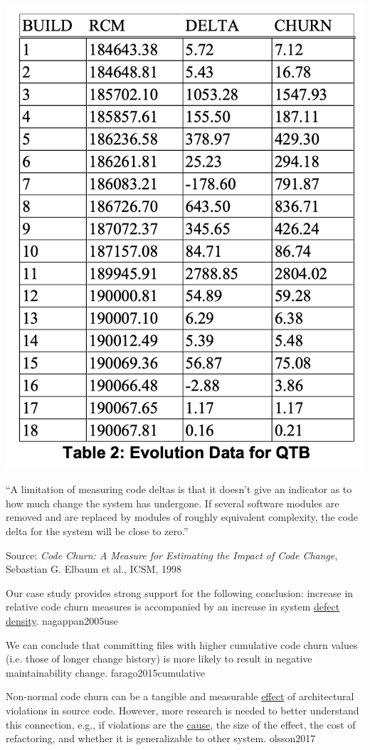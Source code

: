 \documentclass{article}
\begin{document}
\begin{multicols}{2}
\includegraphics[width=.7\columnwidth]{qtb.png}
\par\columnbreak\par
``A limitation of measuring code deltas is that it
doesn’t give an indicator as to how much change the
system has undergone. If several
software modules are removed and are replaced by
modules of roughly equivalent complexity, the code
delta for the system will be close to zero.''
\par
{\scriptsize Source: \textit{Code Churn: A Measure for Estimating the Impact of Code Change}, Sebastian G. Elbaum et al., ICSM, 1998\par}
\end{multicols}
\plush{}

  {Our case study provides strong support for the following conclusion: increase in relative code churn measures is accompanied by an increase in system \ul{defect density}.}
  {nagappan2005use}

  {We can conclude that committing files with higher cumulative code churn values (i.e. those of longer change history) is more likely to result in negative maintainability change.}
  {farago2015cumulative}

  {Non-normal code churn can be a tangible and measurable \ul{effect} of architectural violations in source code. However, more research is needed to better understand this connection, e.g., if violations are the \ul{cause}, the size of the effect, the cost of refactoring, and whether it is generalizable to other system.}
  {olsson2017}
\end{document}
